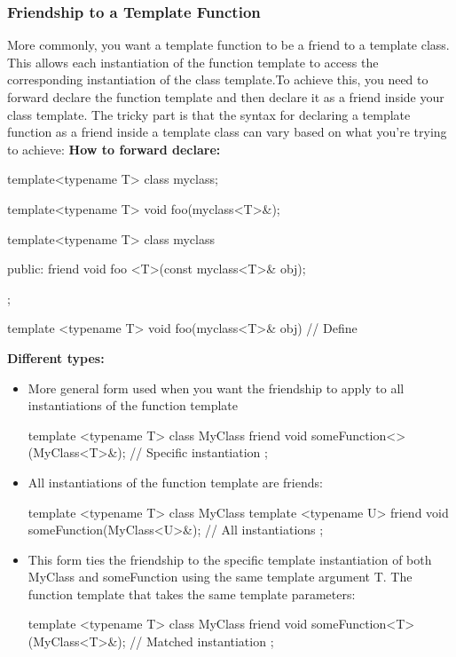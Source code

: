 \documentclass{report}
\begin{document}
    \subsubsection{Friendship to a Template Function}
    \bigbreak \noindent 
    More commonly, you want a template function to be a friend to a template class. This allows each instantiation of the function template to access the corresponding instantiation of the class template.To achieve this, you need to forward declare the function template and then declare it as a friend inside your class template. The tricky part is that the syntax for declaring a template function as a friend inside a template class can vary based on what you're trying to achieve:
     \bigbreak \noindent 
    \textbf{How to forward declare:}
    \bigbreak \noindent 
    \begin{cppcode}
    template<typename T>
    class myclass;

    template<typename T>
    void foo(myclass<T>&); 


    template<typename T>
    class myclass {

    public:
        friend void foo <T>(const myclass<T>& obj);
    };

template <typename T>
void foo(myclass<T>& obj) {
    // Define
}
    \end{cppcode}
    \pagebreak 
    \textbf{Different types:}
    \begin{itemize}
        \item More general form used when you want the friendship to apply to all instantiations of the function template
            \bigbreak \noindent 
            \begin{cppcode}
                template <typename T>
                class MyClass {
                    friend void someFunction<>(MyClass<T>&); // Specific instantiation
                };
            \end{cppcode}
        \item All instantiations of the function template are friends:
            \bigbreak \noindent 
            \begin{cppcode}
                template <typename T>
                class MyClass {
                    template <typename U>
                    friend void someFunction(MyClass<U>&); // All instantiations
                };
            \end{cppcode}
        \item This form ties the friendship to the specific template instantiation of both MyClass and someFunction using the same template argument T. The function template that takes the same template parameters:
            \bigbreak \noindent 
            \begin{cppcode}
                template <typename T>
                class MyClass {
                    friend void someFunction<T>(MyClass<T>&); // Matched instantiation
                };
            \end{cppcode}
    \end{itemize}
\end{document}
